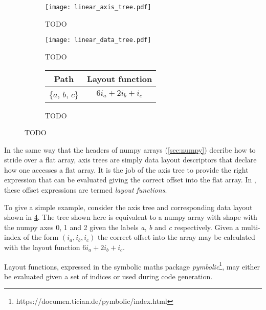 \documentclass[thesis]{subfiles}
\begin{document}
\begin{figure}
  \centering
  \begin{subfigure}{.3\textwidth}
    \centering
    \texttt{[image: linear\_axis\_tree.pdf]}
    \caption{TODO}
    \label{fig:linear_axis_tree}
  \end{subfigure}
  \begin{subfigure}{.58\textwidth}
    \centering
    \texttt{[image: linear\_data\_tree.pdf]}
    \caption{TODO}
    \label{fig:linear_data_tree}
  \end{subfigure}

  \vspace{1em}

  \begin{subfigure}{\textwidth}
    \centering
    \begin{tabular}{|c|c|}
      \hline
      \textbf{Path} & \textbf{Layout function} \\
      \hline
      \{$a$, $b$, $c$\} & $6 i_a + 2 i_b + i_c$ \\
      \hline
    \end{tabular}
    \caption{TODO}
    \label{fig:linear_layouts}
  \end{subfigure}
  \caption{TODO}
  \label{fig:linear_axis_data_tree}
\end{figure}

In the same way that the headers of numpy arrays (\cref{sec:numpy}) decribe how to stride over a flat array, axis trees are simply data layout descriptors that declare how one accesses a flat array.
It is the job of the axis tree to provide the right expression that can be evaluated giving the correct offset into the flat array.
In , these offset expressions are termed \textit{layout functions}.


To give a simple example, consider the axis tree and corresponding data layout shown in \cref{fig:linear_axis_data_tree}.
The tree shown here is equivalent to a numpy array with shape  with the numpy axes 0, 1 and 2 given the labels \textit{a}, \textit{b} and \textit{c} respectively.
Given a multi-index of the form $(i_a, i_b, i_c)$ the correct offset into the array may be calculated with the layout function $6 i_a + 2 i_b + i_c$.

Layout functions, expressed in the symbolic maths package \textit{pymbolic}\footnote{https://documen.tician.de/pymbolic/index.html}, may either be evaluated given a set of indices or used during code generation.
\end{document}
